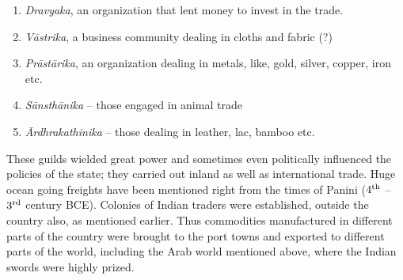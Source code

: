 \begin{enumerate}[(1)]
\item {\it Dravyaka}, an organization that lent money to invest in the trade.
\item {\it Vāstrika}, a business community dealing in cloths and fabric (?)
\item {\it Prāstārika}, an organization dealing in metals, like, gold, silver, copper, iron etc.
\item {\it Sānsthānika} – those engaged in animal trade
\item {\it Ārdhrakathinika} – those dealing in leather, lac, bamboo etc.
\end{enumerate}

These guilds wielded great power and sometimes even politically influenced the policies of the state; they carried out inland as well as international trade. Huge ocean going freights have been mentioned right from the times of Panini ($4^{\rm th}$ –$3^{\rm rd}$ century BCE). Colonies of Indian traders were established, outside the country also, as mentioned earlier. Thus commodities manufactured in different parts of the country were brought to the port towns and exported to different parts of the world, including the Arab world mentioned above, where the Indian swords were highly prized.

